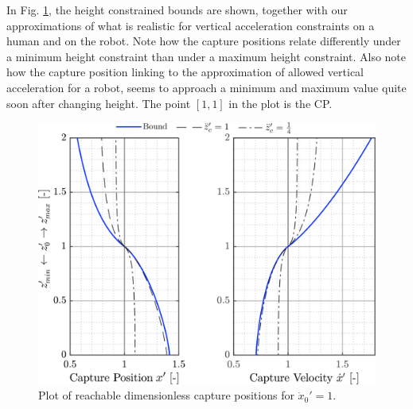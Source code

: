 In Fig. \ref{fig:caplimits}, the height constrained bounds are shown, together with our approximations of what is realistic for vertical acceleration constraints on a human and on the robot. Note how the capture positions relate differently under a minimum height constraint than under a maximum height constraint. Also note how the capture position linking to the approximation of allowed vertical acceleration for a robot, seems to approach a minimum and maximum value quite soon after changing height. The point $[1,1]$ in the plot is the \ac{CP}.
\begin{figure}
      \centering
      \includegraphics[width=5.2in]{STYLESTUFF/caplimits1.png}
      \caption{Plot of reachable dimensionless capture positions for $\dot{x}_0'=1$. }
      \label{fig:caplimits}
\end{figure}
